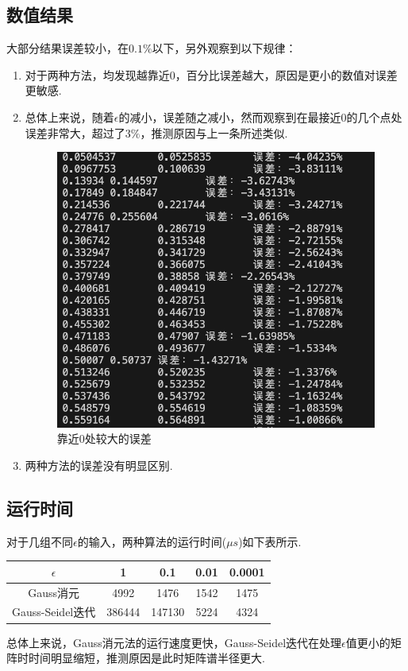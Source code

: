 \documentclass[UTF8]{ctexart}
\begin{document}
\subsection{数值结果}
大部分结果误差较小，在$0.1\%$以下，另外观察到以下规律：
\begin{enumerate}
  \item 对于两种方法，均发现越靠近$0$，百分比误差越大，原因是更小的数值对误差更敏感.
  \item 总体上来说，随着$\epsilon$的减小，误差随之减小，然而观察到在最接近$0$的几个点处误差非常大，超过了$3\%$，推测原因与上一条所述类似.
\begin{figure}[h]
    \centering
    \includegraphics[scale=0.5]{pic1.png}
    \caption{靠近0处较大的误差}
\end{figure}
  \item 两种方法的误差没有明显区别.
\end{enumerate}

\subsection{运行时间}
对于几组不同$\epsilon$的输入，两种算法的运行时间($\mu s$)如下表所示.

\begin{table}[H]
  \centering
  \begin{tabular}{ccccc}
    \hline
    $\epsilon$ & 1 & 0.1 & 0.01 & 0.0001 \\
    \hline \hline
    Gauss消元 & 4992 & 1476 & 1542 & 1475 \\
    Gauss-Seidel迭代 & 386444 & 147130 & 5224 & 4324 \\
    \hline
  \end{tabular}
\end{table}

总体上来说，Gauss消元法的运行速度更快，Gauss-Seidel迭代在处理$\epsilon$值更小的矩阵时时间明显缩短，推测原因是此时矩阵谱半径更大.


\end{document}
